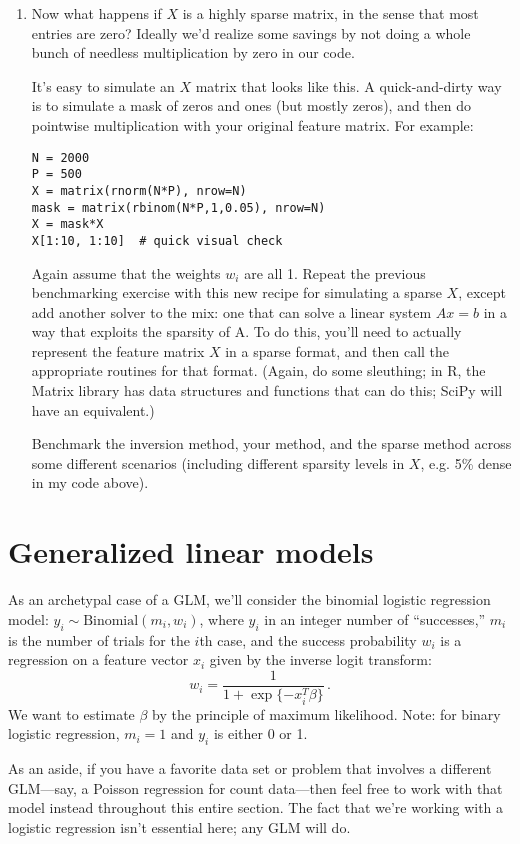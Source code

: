 \documentclass{article}
\begin{document}
\begin{enumerate}
\item Now what happens if $X$ is a highly sparse matrix, in the sense that most entries are zero?  Ideally we'd realize some savings by not doing a whole bunch of needless multiplication by zero in our code.

It's easy to simulate an $X$ matrix that looks like this.  A quick-and-dirty way is to simulate a mask of zeros and ones (but mostly zeros), and then do pointwise multiplication with your original feature matrix.  For example:
\begin{verbatim}
N = 2000
P = 500
X = matrix(rnorm(N*P), nrow=N)
mask = matrix(rbinom(N*P,1,0.05), nrow=N)
X = mask*X
X[1:10, 1:10]  # quick visual check
\end{verbatim}

Again assume that the weights $w_i$ are all 1.  Repeat the previous benchmarking exercise with this new recipe for simulating a sparse $X$, except add another solver to the mix: one that can solve a linear system $Ax = b$ in a way that exploits the sparsity of A.  To do this, you'll need to actually represent the feature matrix $X$ in a sparse format, and then call the appropriate routines  for that format.  (Again, do some sleuthing; in R, the Matrix library has data structures and functions that can do this; SciPy will have an equivalent.)

Benchmark the inversion method, your method, and the sparse method across some different scenarios (including different sparsity levels in $X$, e.g. 5\% dense in my code above).
\end{enumerate}


\section{Generalized linear models}

As an archetypal case of a GLM, we'll consider the binomial logistic regression model: $y_i \sim \mbox{Binomial}(m_i, w_i)$, where $y_i$ in an integer number of ``successes,'' $m_i$ is the number of trials for the $i$th case, and the success probability $w_i$ is a regression on a feature vector $x_i$ given by the inverse logit transform:
$$
w_i = \frac{1}{1 + \exp\{-x_i^T \beta\}} \, .
$$
We want to estimate $\beta$ by the principle of maximum likelihood.  Note: for binary logistic regression, $m_i = 1$ and $y_i$ is either 0 or 1.

As an aside, if you have a favorite data set or problem that involves a different GLM---say, a Poisson regression for count data---then feel free to work with that model instead throughout this entire section.  The fact that we're working with a logistic regression isn't essential here; any GLM will do.
\end{document}
